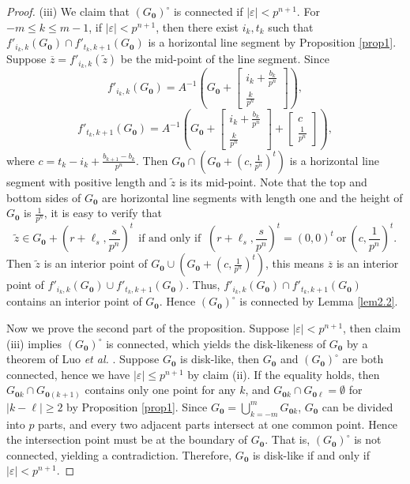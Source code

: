 \documentclass[12pt, reqno]{amsart}
\numberwithin{equation}{section}
\begin{document}
\begin{proof}
(iii) We claim that $(G_{\mathbf 0})^\circ$ is connected if $|\varepsilon|< p^{n+1}$. For $-m\leq k\leq m-1$, if $|\varepsilon|< p^{n+1}$, then
there exist $i_k,t_k$ such that $f'_{i_k,k}(G_{\mathbf 0})\cap f'_{t_k,k+1}(G_{\mathbf 0})$ is a horizontal line segment by Proposition \ref{prop1}. Suppose $\overline{z}=f'_{i_k,k}(\tilde{z})$ be the mid-point of the line segment. Since
$$f'_{i_k,k}(G_{\mathbf 0})=A^{-1}\left(G_{\mathbf 0}+\left[\begin{array}{c}
i_k+\frac{b_k}{p^n}\\
\frac{k}{p^n}
\end{array}\right]\right),$$
$$f'_{t_k,k+1}(G_{\mathbf 0})=A^{-1}\left(G_{\mathbf 0}+\left[\begin{array}{c}
i_k+\frac{b_k}{p^n}\\
\frac{k}{p^n}
\end{array}\right]+\left[\begin{array}{c}
c\\
\frac{1}{p^n}
\end{array}\right]\right),$$
where $c=t_k-i_k+\frac{b_{k+1}-b_k}{p^n}$. Then $G_{\mathbf 0}\cap (G_{\mathbf 0}+(c,\frac{1}{p^n})^t)$ is a horizontal line segment with positive length and $\tilde{z}$ is its mid-point. Note that the top and bottom sides of $G_{\mathbf 0}$ are horizontal line segments with length one and the height of $G_{\mathbf 0}$ is $\frac{1}{p^n}$, it is easy to verify that
$$\tilde{z}\in G_{\mathbf 0}+(r+\ell_s,\frac{s}{p^n})^t \ \  \text{if and only if } \ (r+\ell_s,\frac{s}{p^n})^t=(0,0)^t \ \text{or} \ (c,\frac{1}{p^n})^t.$$ Then $\tilde{z}$ is an interior point of $G_{\mathbf 0}\cup (G_{\mathbf 0}+(c,\frac{1}{p^n})^t)$, this means $\overline{z}$ is an interior point of $f'_{i_k,k}(G_{\mathbf 0})\cup f'_{t_k,k+1}(G_{\mathbf 0})$. Thus, $f'_{i_k,k}(G_{\mathbf 0})\cap f'_{t_k,k+1}(G_{\mathbf 0})$ contains an interior point of $G_{\mathbf 0}$. Hence $(G_{\mathbf 0})^\circ$ is connected by Lemma \ref{lem2.2}.


Now we prove the second part of the proposition.  Suppose $|\varepsilon|<p^{n+1}$, then claim (iii) implies $(G_{\mathbf 0})^\circ$ is connected, which yields the disk-likeness of $G_{\mathbf 0}$ by a theorem of Luo {\it et al.} \cite{LRT}. Suppose $G_{\mathbf 0}$ is disk-like, then $G_{\mathbf 0}$ and $(G_{\mathbf 0})^\circ$ are both connected, hence we have  $|\varepsilon|\leq p^{n+1}$ by claim (ii). If the equality holds, then $G_{\mathbf 0k}\cap G_{\mathbf 0(k+1)}$ contains only one point for any $k$, and  $G_{\mathbf 0k}\cap G_{\mathbf 0\ell}=\emptyset$ for $|k-\ell|\geq 2$ by Proposition \ref{prop1}. Since $G_{\mathbf 0}=\bigcup_{k=-m}^{m}G_{{\mathbf 0}k}$, $G_{\mathbf 0}$ can be divided into $p$ parts, and every two adjacent parts intersect at one common point. Hence the intersection point must be at the boundary of $G_{\mathbf 0}$. That is,  $(G_{\mathbf 0})^\circ$ is not connected, yielding a contradiction.  Therefore, $G_{\mathbf 0}$ is disk-like if and only if $|\varepsilon|<p^{n+1}$.
\end{proof}
\end{document}
